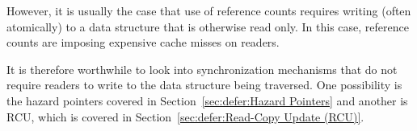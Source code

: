 
However, it is usually the case that use of reference counts requires
writing (often atomically) to a data structure that is otherwise
read only.
In this case, reference counts are imposing expensive cache misses
on readers.

It is therefore worthwhile to look into synchronization mechanisms
that do not require readers to write to the data structure being
traversed.
One possibility is the hazard pointers covered in
Section~\ref{sec:defer:Hazard Pointers}
and another is RCU, which is covered in
Section~\ref{sec:defer:Read-Copy Update (RCU)}.
